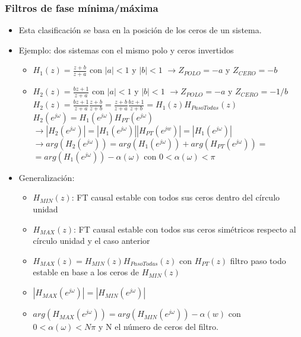 \documentclass[handout]{beamer}
\numberwithin{section}{part}
\begin{document}
\begin{frame}
  \frametitle{Filtros de fase mínima/máxima}
  \vspace{-0.2cm}
  \begin{itemize}
    \footnotesize
    \item Esta clasificación se basa en la posición de los ceros de un sistema.
    \item \color{olivegreen}Ejemplo: dos sistemas con el mismo polo y ceros invertidos
    \begin{itemize}
      \color{gray}
      \footnotesize
      \item $H_1(z)=\frac{z+b}{z+a}$   con $|a|<1$ y $|b|<1$  $\rightarrow Z_{POLO}=-a$ y  $Z_{CERO}=-b$
      \item $H_2(z)=\frac{bz+1}{z+a}$   con $|a|<1$ y $|b|<1$ $\rightarrow Z_{POLO}=-a$ y  $Z_{CERO}=-1/b$
      \vspace{0.1cm}
      $H_2(z)=\frac{bz+1}{z+a}\frac{z+b}{z+b}=\frac{z+b}{z+a}\frac{bz+1}{z+b}=H_1(z)H_{PasoTodas}(z)$
      \vspace{0.1cm}
      $H_2(e^{j\omega})=H_1(e^{j\omega})H_{PT}(e^{j\omega})$ 
      \vspace{0.1cm}
      \scriptsize
      \hspace{1cm}$\rightarrow |H_2(e^{j\omega})|=|H_1(e^{j\omega})||H_{PT}(e^{jw})|=|H_1(e^{j\omega})|$
      \vspace{0.1cm}
      \hspace{1cm}$\rightarrow arg(H_2(e^{j\omega}))=arg(H_1(e^{j\omega}))+arg(H_{PT}(e^{j\omega}))=$
      \vspace{0.1cm}
      \hspace{3.1cm}$=arg(H_1(e^{j\omega}))-\alpha(\omega)$ con $0<\alpha(\omega)<\pi$
      \color{black}
    \end{itemize}  
    \vspace{-0.3cm}  
    \color{black}
    \item Generalización:
    \begin{itemize}
      \scriptsize
      \item $H_{MIN}(z)$: FT causal estable con todos sus ceros dentro del círculo unidad
      \item $H_{MAX}(z)$: FT causal estable con todos sus ceros simétricos respecto al círculo unidad y el caso anterior
      \item $H_{MAX}(z)=H_{MIN}(z)H_{PasoTodas}(z)$ con $H_{PT}(z)$ filtro paso todo estable en base a los ceros de $H_{MIN}(z)$
      \item $|H_{MAX}(e^{j\omega})|=|H_{MIN}(e^{j\omega})|$
      \item $arg(H_{MAX}(e^{j\omega}))=arg(H_{MIN}(e^{j\omega}))-\alpha(w)$ con $0<\alpha(\omega)<N\pi$ y N el número de ceros del filtro.
    \end{itemize}
  \end{itemize}
\end{frame}
  
\end{document}
